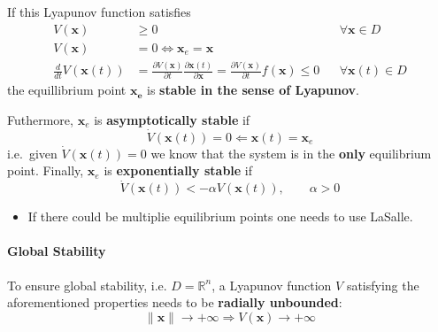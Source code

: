 If this Lyapunov function satisfies
\noindent\begin{align*}
    V(\mathbf{x})                 & \geq 0                                                                                                                                                          &  & \forall \mathbf{x}\in D    \\
    V(\mathbf{x})                 & = 0 \Leftrightarrow \mathbf{x}_e = \mathbf{x}                                                                                                                                                   \\
    \frac{d}{dt} V(\mathbf{x}(t)) & = \frac{\partial V(\mathbf{x})}{\partial t} \frac{\partial \mathbf{x}(t)}{\partial \mathbf{x}} = \frac{\partial V(\mathbf{x})}{\partial t} f(\mathbf{x}) \leq 0 &  & \forall \mathbf{x}(t)\in D
\end{align*}
the equillibrium point $\mathbf{x_e}$ is \textbf{stable in the sense of Lyapunov}.

\newpar{}
Futhermore, $\mathbf{x}_e$ is \textbf{asymptotically stable} if
\noindent\begin{equation*}
    \dot{V}(\mathbf{x}(t)) = 0 \Leftarrow \mathbf{x}(t) = \mathbf{x}_e
\end{equation*}
i.e.\ given $\dot{V}(\mathbf{x}(t)) = 0$ we know that the system is in the \textbf{only} equilibrium point. Finally, $\mathbf{x}_e$ is \textbf{exponentially stable} if
\noindent\begin{equation*}
    \dot{V}(\mathbf{x}(t)) < -\alpha V(\mathbf{x}(t)), \qquad \alpha>0
\end{equation*}

\newpar{}
\begin{itemize}
    \item If there could be multiplie equilibrium points one needs to use LaSalle.
\end{itemize}

\paragraph{Global Stability}
To ensure global stability, i.e. $D=\mathbb{R}^n$, a Lyapunov function $V$ satisfying the aforementioned properties needs to be \textbf{radially unbounded}:
\noindent\begin{equation*}
    \|\mathbf{x}\| \to +\infty \Rightarrow V(\mathbf{x}) \to +\infty
\end{equation*}

